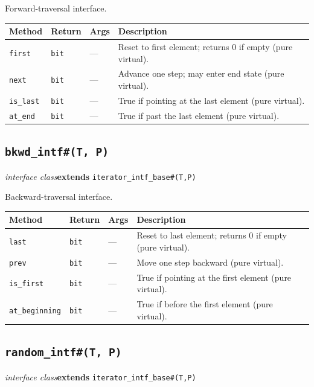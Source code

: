 \documentclass[11pt,letterpaper]{report}
\begin{document}
Forward-traversal interface.

\begin{xltabular}{\linewidth}{>{\small}p{1.35in} >{\small}p{1.25in} >{\small}p{0.95in} >{\small}X}
\toprule
\textbf{Method} & \textbf{Return} & \textbf{Args} & \textbf{Description} \\
\midrule
\endhead
\bottomrule
\endfoot
\texttt{first} & \texttt{bit} & --- & Reset to first element; returns 0 if empty (pure virtual). \\
\texttt{next} & \texttt{bit} & --- & Advance one step; may enter end state (pure virtual). \\
\texttt{is\_last} & \texttt{bit} & --- & True if pointing at the last element (pure virtual). \\
\texttt{at\_end} & \texttt{bit} & --- & True if past the last element (pure virtual). \\
\end{xltabular}

\subsection*{\texttt{bkwd\_intf\#(T, P)}}
\noindent\small\textit{interface class}\quad \textbf{extends} \texttt{iterator\_intf\_base\#(T,P)}\par

Backward-traversal interface.

\begin{xltabular}{\linewidth}{>{\small}p{1.35in} >{\small}p{1.25in} >{\small}p{0.95in} >{\small}X}
\toprule
\textbf{Method} & \textbf{Return} & \textbf{Args} & \textbf{Description} \\
\midrule
\endhead
\bottomrule
\endfoot
\texttt{last} & \texttt{bit} & --- & Reset to last element; returns 0 if empty (pure virtual). \\
\texttt{prev} & \texttt{bit} & --- & Move one step backward (pure virtual). \\
\texttt{is\_first} & \texttt{bit} & --- & True if pointing at the first element (pure virtual). \\
\texttt{at\_beginning} & \texttt{bit} & --- & True if before the first element (pure virtual). \\
\end{xltabular}

\subsection*{\texttt{random\_intf\#(T, P)}}
\noindent\small\textit{interface class}\quad \textbf{extends} \texttt{iterator\_intf\_base\#(T,P)}\par
\end{document}
